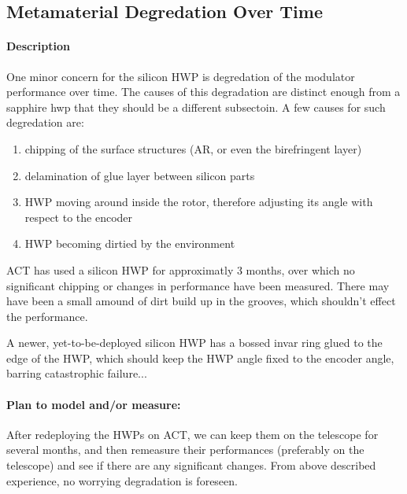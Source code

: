 \subsection{Metamaterial Degredation Over Time}

\paragraph{Description} 

One minor concern for the silicon HWP is degredation of the modulator performance over time. The causes of this degradation are distinct enough from a sapphire hwp that they should be a different subsectoin.  A few causes for such degredation are:

\begin{enumerate}
	\item chipping of the surface structures (AR, or even the birefringent layer)
	\item delamination of glue layer between silicon parts
	\item HWP moving around inside the rotor, therefore adjusting its angle with respect to the encoder
	\item HWP becoming dirtied by the environment
\end{enumerate}

ACT has used a silicon HWP for approximatly 3 months, over which no significant chipping or changes in performance have been measured.  There may have been a small amound of dirt build up in the grooves, which shouldn't effect the performance.

A newer, yet-to-be-deployed silicon HWP has a bossed invar ring glued to the edge of the HWP, which should keep the HWP angle fixed to the encoder angle, barring catastrophic failure...
  
\paragraph{Plan to model and/or measure:}

After redeploying the HWPs on ACT, we can keep them on the telescope for several months, and then remeasure their performances (preferably on the telescope) and see if there are any significant changes.  From above described experience, no worrying degradation is foreseen.



